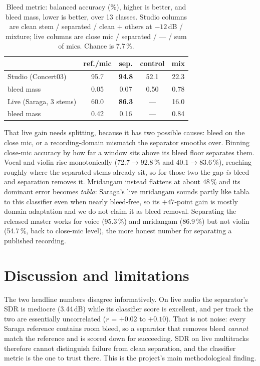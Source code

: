 \documentclass[11pt,a4paper,twocolumn]{article}
\begin{document}
\begin{table}[h]
\centering
\small
\begin{tabular}{lcccc}
\toprule
 & ref./mic & sep. & control & mix \\
\midrule
Studio (Concert03) & 95.7 & \textbf{94.8} & 52.1 & 22.3 \\
\quad bleed mass & 0.05 & 0.07 & 0.50 & 0.78 \\
Live (Saraga, 3 stems) & 60.0 & \textbf{86.3} & --- & 16.0 \\
\quad bleed mass & 0.42 & 0.16 & --- & 0.84 \\
\bottomrule
\end{tabular}
\caption{Bleed metric: balanced accuracy (\%), higher is better, and bleed mass, lower is better,
over 13 classes. Studio columns are clean stem / separated / clean $+$ others at $-12$\,dB /
mixture; live columns are close mic / separated / --- / sum of mics. Chance is 7.7\,\%.}
\label{tab:bleed}
\end{table}

That live gain needs splitting, because it has two possible causes: bleed on the close mic, or a
recording-domain mismatch the separator smooths over. Binning close-mic accuracy by how far a
window sits above its bleed floor separates them. Vocal and violin rise monotonically
(72.7$\rightarrow$92.8\,\% and 40.1$\rightarrow$83.6\,\%), reaching roughly where the separated
stems already sit, so for those two the gap \emph{is} bleed and separation removes it. Mridangam
instead flattens at about 48\,\% and its dominant error becomes \emph{tabla}: Saraga's live
mridangam sounds partly like tabla to this classifier even when nearly bleed-free, so its
$+47$-point gain is mostly domain adaptation and we do not claim it as bleed removal. Separating
the released master works for voice (95.3\,\%) and mridangam (86.9\,\%) but not violin (54.7\,\%,
back to close-mic level), the more honest number for separating a published recording.

\section{Discussion and limitations}
The two headline numbers disagree informatively. On live audio the separator's SDR is mediocre
(3.44\,dB) while its classifier score is excellent, and per track the two are essentially
uncorrelated ($r$ = $+0.02$ to $+0.10$). That is not noise: every Saraga reference contains room
bleed, so a separator that removes bleed \emph{cannot} match the reference and is scored down for
succeeding. SDR on live multitracks therefore cannot distinguish failure from clean separation,
and the classifier metric is the one to trust there. This is the project's main methodological
finding.
\end{document}
